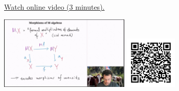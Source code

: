 
\begin{minipage}{10cm}
    \href{https://act4e-spring21.netlify.app/videos/spring2021-monads-b:morph-algebras.html}{Watch online video (3 minutes).}
        
    \href{https://act4e-spring21.netlify.app/videos/spring2021-monads-b:morph-algebras.html}{\includegraphics[height=3.5cm]{spring2021-monads-b:morph-algebras/thumbnails.jpg}}
    \href{https://act4e-spring21.netlify.app/videos/spring2021-monads-b:morph-algebras.html}{\includegraphics[height=2.5cm]{spring2021-monads-b:morph-algebras/qrcode.png}}
\end{minipage}
